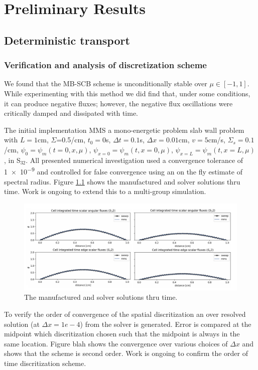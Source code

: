 \chapter{Preliminary Results}
\label{ch:results}

\section{Deterministic transport}

\subsection{Verification and analysis of discretization scheme}

We found that the MB-SCB scheme is unconditionally stable over $\mu \in [-1, 1]$. While experimenting with this method we did find that, under some conditions, it can produce negative fluxes; however, the negative flux oscillations were critically damped and dissipated with time.

The initial implementation MMS a mono-energetic problem slab wall problem with $L=1$cm, $\Sigma$=0.5/cm, $t_0=0$s, $\Delta t = 0.1$s, $\Delta x=0.01$cm, $v=5$cm/s, $\Sigma_s=0.1$/cm, $\psi_0=\psi_m(t=0,x,\mu)$, $\psi_{x=0}=\psi_m(t,x=0,\mu)$, $\psi_{x=L}=\psi_m(t,x=L,\mu)$, in S$_{32}$.
All presented numerical investigation used a convergence tolerance of \num{1e-9} and controlled for false convergence using an on the fly estimate of spectral radius.
Figure \ref{fig:mms_sol} shows the manufactured and solver solutions thru time.
Work is ongoing to extend this to a multi-group simulation.

\begin{figure}[h!]
    \centering
    \includegraphics[width=.75\textwidth]{figures/results/mms_sol.png}
    \caption{The manufactured and solver solutions thru time.}
    \label{fig:mms_sol}
\end{figure}

To verify the order of convergence of the spatial discritization an over resolved solution (at $\Delta x=1e-4$) from the solver is generated.
Error is compared at the midpoint which discritization chosen such that the midpoint is always in the same location.
Figure blah shows the convergence over various choices of $\Delta x$ and shows that the scheme is second order.
Work is ongoing to confirm the order of time discritization scheme.

